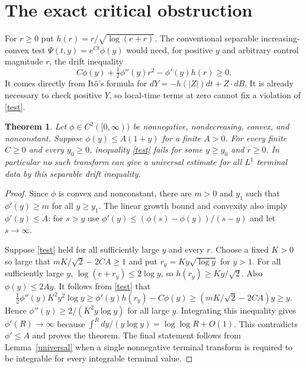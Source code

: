 \documentclass[11pt]{article}
\newtheorem{theorem}{Theorem}
\begin{document}
\section{The exact critical obstruction}
For $r\geq0$ put $h(r)=r/\sqrt{\log(e+r)}$.
The conventional separable increasing-convex test
$\Psi(t,y)=e^{Ct}\phi(y)$ would need, for positive $y$ and arbitrary
control magnitude $r$, the drift inequality
\begin{equation}\label{test}
 C\phi(y)+\tfrac12\phi''(y)r^2-\phi'(y)h(r)\geq0.
\end{equation}
It comes directly from It\^o's formula for $dY=-h(|Z|)dt+Z\cdot dB$.
It is already necessary to check positive $Y$, so local-time terms at zero
cannot fix a violation of \eqref{test}.

\begin{theorem}\label{obstruction}
Let $\phi\in C^2([0,\infty))$ be nonnegative, nondecreasing, convex,
and nonconstant. Suppose $\phi(y)\leq A(1+y)$ for a finite $A>0$.
For every finite $C\geq0$ and every $y_0\geq0$, inequality
\eqref{test} fails for some $y\geq y_0$ and $r\geq0$.
In particular no such transform can give a universal estimate for all
$L^1$ terminal data by this separable drift inequality.
\end{theorem}
\begin{proof}
Since $\phi$ is convex and nonconstant, there are $m>0$ and $y_1$
such that $\phi'(y)\geq m$ for all $y\geq y_1$.
The linear growth bound and convexity also imply $\phi'(y)\leq A$:
for $s>y$ use
$\phi'(y)\leq(\phi(s)-\phi(y))/(s-y)$ and let $s\to\infty$.

Suppose \eqref{test} held for all sufficiently large $y$ and every $r$.
Choose a fixed $K>0$ so large that $mK/\sqrt2-2CA\geq1$ and put
$r_y=Ky\sqrt{\log y}$ for $y>1$.
For all sufficiently large $y$, $\log(e+r_y)\leq2\log y$,
so $h(r_y)\geq Ky/\sqrt2$. Also $\phi(y)\leq2Ay$.
It follows from \eqref{test} that
\[
 \tfrac12\phi''(y)K^2y^2\log y
 \geq \phi'(y)h(r_y)-C\phi(y)
 \geq(mK/\sqrt2-2CA)y\geq y.
\]
Hence $\phi''(y)\geq2/(K^2y\log y)$ for all large $y$.
Integrating this inequality gives $\phi'(R)\to\infty$ because
$\int^Rdy/(y\log y)=\log\log R+O(1)$.
This contradicts $\phi'\leq A$ and proves the theorem.
The final statement follows from Lemma~\ref{universal} when a single
nonnegative terminal transform is required to be integrable for every
integrable terminal value.
\end{proof}
\end{document}
